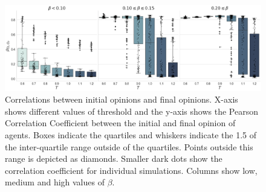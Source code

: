 \documentclass[11pt]{article}
\begin{document}
\begin{figure}[H]
    \centering
    \includegraphics[width=.8\linewidth]{../plots/overall/Correlation_Initial_Opinions.png}
  \caption{Correlations between initial opinions and final opinions. X-axis shows different values of threshold and the y-axis shows the Pearson Correlation Coefficient between the initial and final opinion of agents. Boxes indicate the quartiles and whiskers indicate the 1.5 of the inter-quartile range outside of the quartiles. Points outside this range is depicted as diamonds. Smaller dark dots show the correlation coefficient for individual simulations. Columns show low, medium and high values of $\beta$. }
  \label{appendix:corr_initial_final}
\end{figure}
\end{document}
